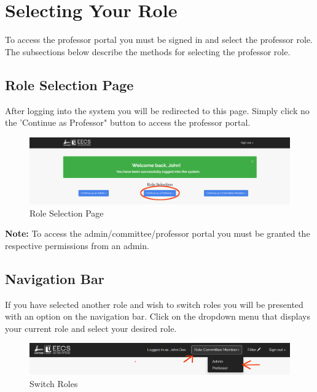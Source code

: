 \documentclass[fontsize=12pt,paper=letter,twoside]{scrartcl}
\begin{document}
\clearpage

\section{Selecting Your Role}
To access the professor portal you must be signed in and select the professor role. The subsections below describe the methods for selecting the professor role.

\subsection{Role Selection Page}
After logging into the system you will be redirected to this page. Simply click no the 'Continue as Professor" button to access the professor portal.

\begin{figure}[!htb]
\begin{center}
\includegraphics[width=.99\textwidth]{images/role-selection.png}
\end{center}
\caption{Role Selection Page}
\label{fig:role_selection1}
\end{figure}

\noindent \textbf{Note:} To access the admin/committee/professor portal you must be granted the respective permissions from an admin.

\subsection{Navigation Bar}
If you have selected another role and wish to switch roles you will be presented with an option on the navigation bar. Click on the dropdown menu that displays your current role and select your desired role.
\begin{figure}[!htb]
\begin{center}
\includegraphics[width=.99\textwidth]{images/role-selection2.png}
\end{center}
\caption{Switch Roles}
\label{fig:role_selection2}
\end{figure}
\end{document}
